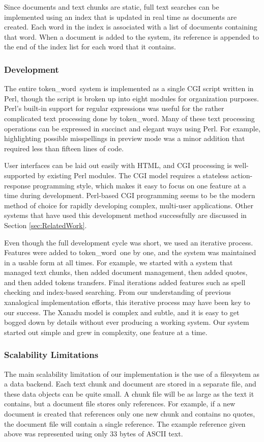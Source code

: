 \documentclass{acm_proc_article-sp}
\newcommand{\tokenWord}{token\_word}
\begin{document}
Since documents and text chunks are static, full text searches can be implemented using an index that is updated in real time as documents are created.
Each word in the index is associated with a list of documents containing that word.
When a document is added to the system, its reference is appended to the end of the index list for each word that it contains.


\subsubsection{Development}
The entire \tokenWord \   system is implemented as a single CGI script written in Perl, though the script is broken up into eight modules for organization purposes.
Perl's built-in support for regular expressions was useful for the rather complicated text processing done by \tokenWord.
Many of these text processing operations can be expressed in succinct and elegant ways using Perl.
For example, highlighting possible misspellings in preview mode was a minor addition that required less than fifteen lines of code.

User interfaces can be laid out easily with HTML, and CGI processing is well-supported by existing Perl modules.
The CGI model requires a stateless action-response programming style, which makes it easy to focus on one feature at a time during development.
Perl-based CGI programming seems to be the modern method of choice for rapidly developing complex, multi-user applications.
Other systems that have used this development method successfully are discussed in Section \ref{sec:RelatedWork}.

Even though the full development cycle was short, we used an iterative process.
Features were added to \tokenWord \  one by one, and the system was maintained in a usable form at all times.
For example, we started with a system that managed text chunks, then added document management, then added quotes, and then added tokens transfers.
Final iterations added features such as spell checking and index-based searching.
From our understanding of previous xanalogical implementation efforts, this iterative process may have been key to our success.
The Xanadu model is complex and subtle, and it is easy to get bogged down by details without ever producing a working system.
Our system started out simple and grew in complexity, one feature at a time.


\subsubsection{Scalability Limitations}
\label{sec:Scalability}
The main scalability limitation of our implementation is the use of a filesystem as a data backend.
Each text chunk and document are stored in a separate file, and these data objects can be quite small.
A chunk file will be as large as the text it contains, but a document file stores only references.
For example, if a new document is created that references only one new chunk and contains no quotes, the document file will contain a single reference.
The example reference given above was represented using only 33 bytes of ASCII text.
\end{document}
